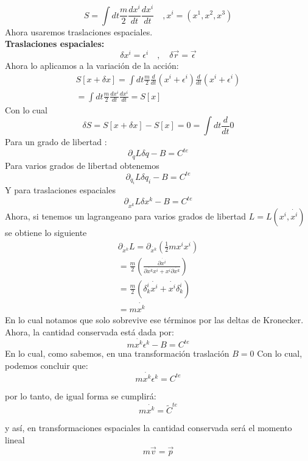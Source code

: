 \documentclass[../main.tex]{subfiles}
\begin{document}
\begin{equation}
    S = \int dt \frac{m}{2}\frac{dx^i}{dt}\frac{dx^i}{dt} \quad , x^i=(x^1,x^2,x^3) 
\end{equation}
Ahora usaremos traslaciones espaciales. \\
\textbf{Traslaciones espaciales:}
\begin{equation}
    \delta x^i= \epsilon^i \quad  , \quad \delta\vec{r}= \vec{\epsilon}
\end{equation}
Ahora lo aplicamos a la variación de la acción:
\begin{align}
 S[x + \delta x ] = \int dt \frac{m}{2} \frac{d}{dt}(x^i + \epsilon^i)  \frac{d}{dt}(x^i + \epsilon^i)  \\
 = \int dt \frac{m}{2} \frac{dx^i}{dt}\frac{dx^i}{dt} = S[x]
\end{align}
Con lo cual
\begin{equation}
    \delta S = S[x+\delta x] - S [x]= 0 = \int dt \frac{d}{dt} 0
\end{equation}
Para un grado de libertad : 
\begin{equation}
    \partial_{\dot{q}}L \delta q - B = C^{te}
\end{equation}
Para varios grados de libertad obtenemos
\begin{equation}
    \partial_{\dot{q_i}}L \delta q_i - B = C^{te}
\end{equation}
Y para traslaciones espaciales
\begin{equation}
    \partial_{\dot{x^k}}L \delta x^k - B = C^{te}
\end{equation}
Ahora, si tenemos un lagrangeano para varios grados de libertad $L=L(x^i, \dot{x^i})$ se obtiene lo siguiente
\begin{align}
    \partial_{\dot{x^k}} L = \partial_{\dot{x^k}} (  \frac{1}{2}m x ^i x ^i ) \\
     = \frac{m}{2} \left(  \frac{\partial \dot{x^i}}{\partial \dot{x^k} x^i + x^i \partial \dot{x^k}}\right) \\
     = \frac{m}{2} \left( \delta_k^i  \dot{x^i} + \dot{x^i} \delta_k^i \right) \\
     = m\dot{x^k}
\end{align}
En lo cual notamos que solo sobrevive ese términos por las deltas de Kronecker. \\
Ahora, la cantidad conservada está dada por:
\begin{equation}
    m\dot{x^k}\epsilon^k-B = C^{te}
\end{equation}
En lo cual, como sabemos, en una transformación traslación $B=0$
Con lo cual, podemos concluir que:
\begin{equation}
    m\dot{x^k} \epsilon^k = C^{te}
\end{equation}

por lo tanto, de igual forma se cumplirá: 
\begin{equation}
    m\dot{x^k} = \tilde{C}^{te}
\end{equation}

y así, en transformaciones espaciales la cantidad conservada será el momento lineal
\begin{equation}
    m\vec{v}=\vec{p}
\end{equation}
\end{document}
